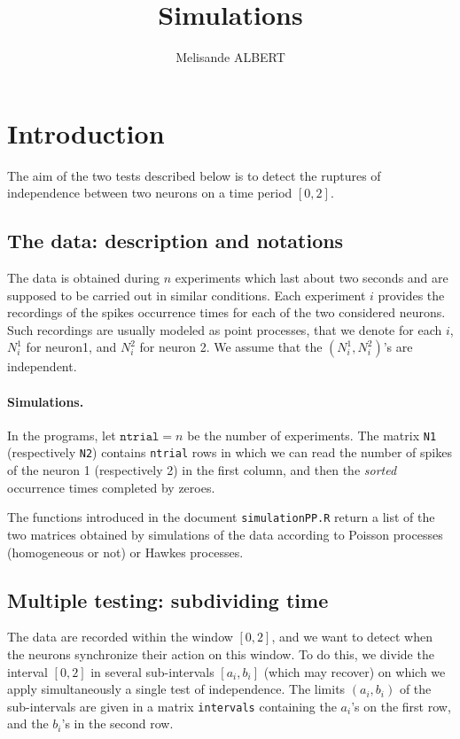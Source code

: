 \documentclass[a4paper,oneside,10pt]{article}
\title{Simulations}     %
\author{Melisande ALBERT}    %
\newcommand{\1}[1]{\ensuremath{\mathds{1}_{\{ #1 \}}}}  %
\begin{document}
\maketitle

\section{Introduction}

The aim of the two tests described below is to detect the ruptures of independence between two neurons on a time period $[0,2]$. 

\subsection{The data: description and notations}


The data is obtained during $n$ experiments which last about two seconds and are supposed to be carried out in similar conditions.
Each experiment $i$ provides the recordings of the spikes occurrence times for each of the two considered neurons. Such recordings are usually modeled as point processes, that we denote for each $i$, $N^1_i$ for neuron1, and $N^2_i$ for neuron 2. 
We assume that the $(N^1_i,N^2_i)$'s are independent.

\paragraph{Simulations.}
In the programs, let $\texttt{ntrial}=n$ be the number of experiments.
The matrix \texttt{N1} (respectively \texttt{N2}) contains \texttt{ntrial} rows in which we can read the number of spikes of the neuron 1 (respectively 2) in the first column, and then the \emph{sorted} occurrence times completed by zeroes.

The functions introduced in the document \texttt{simulationPP.R} return a list of the two matrices obtained by simulations of the data according to Poisson processes (homogeneous or not) or Hawkes processes.


\subsection{Multiple testing: subdividing time}

The data are recorded within the window $[0,2]$, and we want to detect when the neurons synchronize their action on this window. 
To do this, we divide the interval $[0,2]$ in several sub-intervals $[a_i,b_i]$ (which may recover) on which we apply simultaneously a single test of independence. 
The limits $(a_i,b_i)$ of the sub-intervals are given in a matrix \texttt{intervals} containing the $a_i$'s on the first row, and the $b_i$'s in the second row.
\end{document}

